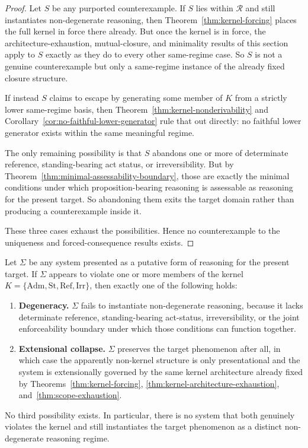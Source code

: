 \begin{proof}
Let $S$ be any purported counterexample. If $S$ lies within $\mathcal{R}$ and still instantiates non-degenerate reasoning, then Theorem~\ref{thm:kernel-forcing} places the full kernel in force there already. But once the kernel is in force, the architecture-exhaustion, mutual-closure, and minimality results of this section apply to $S$ exactly as they do to every other same-regime case. So $S$ is not a genuine counterexample but only a same-regime instance of the already fixed closure structure.

If instead $S$ claims to escape by generating some member of $K$ from a strictly lower same-regime basis, then Theorem~\ref{thm:kernel-nonderivability} and Corollary~\ref{cor:no-faithful-lower-generator} rule that out directly: no faithful lower generator exists within the same meaningful regime.

The only remaining possibility is that $S$ abandons one or more of determinate reference, standing-bearing act status, or irreversibility. But by Theorem~\ref{thm:minimal-assessability-boundary}, those are exactly the minimal conditions under which proposition-bearing reasoning is assessable as reasoning for the present target. So abandoning them exits the target domain rather than producing a counterexample inside it.

These three cases exhaust the possibilities. Hence no counterexample to the uniqueness and forced-consequence results exists.
\end{proof}


\begin{theorem}
\label{thm:non-kernel-collapse-or-exit}
Let $\Sigma$ be any system presented as a putative form of reasoning for the present target. If $\Sigma$ appears to violate one or more members of the kernel $K=\{\mathrm{Adm},\mathrm{St},\mathrm{Ref},\mathrm{Irr}\}$, then exactly one of the following holds:
\begin{enumerate}
  \item \textbf{Degeneracy.} $\Sigma$ fails to instantiate non-degenerate reasoning, because it lacks determinate reference, standing-bearing act-status, irreversibility, or the joint enforceability boundary under which those conditions can function together.
  \item \textbf{Extensional collapse.} $\Sigma$ preserves the target phenomenon after all, in which case the apparently non-kernel structure is only presentational and the system is extensionally governed by the same kernel architecture already fixed by Theorems~\ref{thm:kernel-forcing}, \ref{thm:kernel-architecture-exhaustion}, and~\ref{thm:scope-exhaustion}.
\end{enumerate}
No third possibility exists. In particular, there is no system that both genuinely violates the kernel and still instantiates the target phenomenon as a distinct non-degenerate reasoning regime.
\end{theorem}

